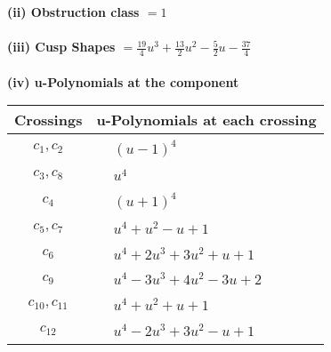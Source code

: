\documentclass[1p]{elsarticle_modified}
\theoremstyle{definition}
\begin{document}
\flushleft \textbf{(ii) Obstruction class $= 1$}\\~\\
\flushleft \textbf{(iii) Cusp Shapes $= \frac{19}{4} u^3+\frac{13}{2} u^2-\frac{5}{2} u-\frac{37}{4}$}\\~\\
\newpage\renewcommand{\arraystretch}{1}
\flushleft \textbf{(iv) u-Polynomials at the component}\newline \\
\begin{tabular}{m{50pt}|m{274pt}}
Crossings & \hspace{64pt}u-Polynomials at each crossing \\
\hline $$\begin{aligned}c_{1},c_{2}\end{aligned}$$&$\begin{aligned}
&(u-1)^4
\end{aligned}$\\
\hline $$\begin{aligned}c_{3},c_{8}\end{aligned}$$&$\begin{aligned}
&u^4
\end{aligned}$\\
\hline $$\begin{aligned}c_{4}\end{aligned}$$&$\begin{aligned}
&(u+1)^4
\end{aligned}$\\
\hline $$\begin{aligned}c_{5},c_{7}\end{aligned}$$&$\begin{aligned}
&u^4+u^2- u+1
\end{aligned}$\\
\hline $$\begin{aligned}c_{6}\end{aligned}$$&$\begin{aligned}
&u^4+2 u^3+3 u^2+u+1
\end{aligned}$\\
\hline $$\begin{aligned}c_{9}\end{aligned}$$&$\begin{aligned}
&u^4-3 u^3+4 u^2-3 u+2
\end{aligned}$\\
\hline $$\begin{aligned}c_{10},c_{11}\end{aligned}$$&$\begin{aligned}
&u^4+u^2+u+1
\end{aligned}$\\
\hline $$\begin{aligned}c_{12}\end{aligned}$$&$\begin{aligned}
&u^4-2 u^3+3 u^2- u+1
\end{aligned}$\\
\hline
\end{tabular}\\~\\
\end{document}

